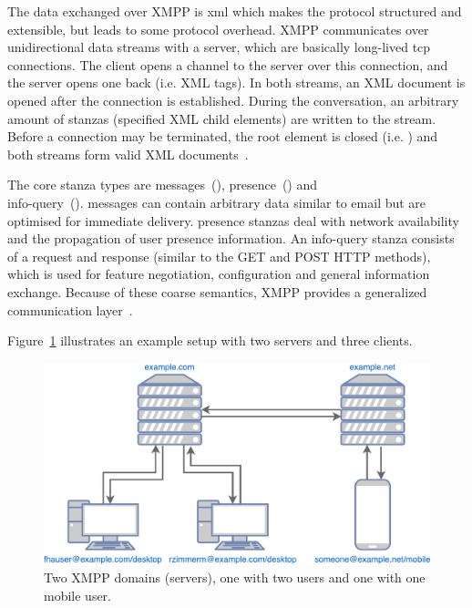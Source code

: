 The data exchanged over XMPP is \gls{xml} which makes the protocol structured and extensible, but leads to some protocol overhead.
XMPP communicates over unidirectional data streams with a server, which are basically long-lived \gls{tcp} connections.
The client opens a channel to the server over this connection, and the server opens one back (i.e.  XML tags). In both streams, an XML document is opened after the connection is established.
During the conversation, an arbitrary amount of \glspl{stanza} (specified XML child elements) are written to the stream.
Before a connection may be terminated, the root element is closed (i.e. ) and both streams form valid XML documents~\cite{rfc6120}\cite{professional-xmpp}.

The core \gls{stanza} types are \glspl{message}~(), \gls{presence}~() and\\
\gls{info-query}~().
\Glspl{message} can contain arbitrary data similar to email but are optimised for immediate delivery.
\Gls{presence} \glspl{stanza} deal with network availability and the propagation of user presence information.
An \gls{info-query} \gls{stanza} consists of a request and response (similar to the GET and POST HTTP methods), which is used for feature negotiation, configuration and general information exchange.
Because of these coarse semantics, XMPP provides a generalized communication layer~\cite{rfc6120}\cite{ieee-xplore-stream-xml-xmpp}.

Figure~\ref{fig:xmpp-overview} illustrates an example setup with two servers and three clients.

\begin{figure}[h]
	\centering
	\includegraphics[width=0.8\linewidth]{resources/xmpp_overview.pdf}
	\caption{Two XMPP domains (servers), one with two users and one with one mobile user.}
	\label{fig:xmpp-overview}
\end{figure}

